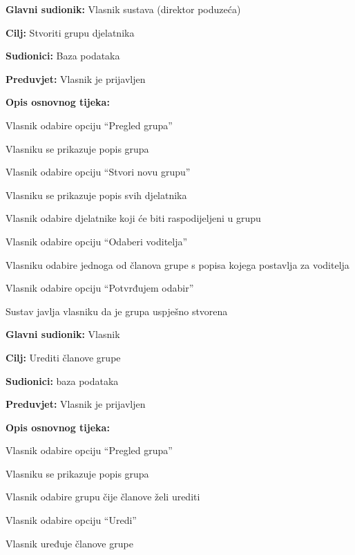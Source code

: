 			\noindent {}
			\begin{packed_item}
			
			\item \textbf{Glavni sudionik: } Vlasnik sustava (direktor poduzeća)
			\item  \textbf{Cilj:} Stvoriti grupu djelatnika 
			\item  \textbf{Sudionici:} Baza podataka
			\item  \textbf{Preduvjet:} Vlasnik je prijavljen
			\item  \textbf{Opis osnovnog tijeka:}
			\item[] \begin{packed_enum}
				\item Vlasnik odabire opciju “Pregled grupa” 
				\item Vlasniku se prikazuje popis grupa 
				\item Vlasnik odabire opciju “Stvori novu grupu” 
				\item Vlasniku se prikazuje popis svih djelatnika  
				\item Vlasnik odabire djelatnike koji će biti raspodijeljeni u grupu 
				\item Vlasnik odabire opciju “Odaberi voditelja” 
				\item Vlasniku odabire jednoga od članova grupe s popisa kojega postavlja za voditelja 
				\item Vlasnik odabire opciju “Potvrđujem odabir” 
				\item Sustav javlja vlasniku da je grupa uspješno stvorena 
					\end{packed_enum}
			\end{packed_item}
			\noindent \underbar{\textbf{UC7 -Uređivanje grupe}}
			\begin{packed_item}
				
				\item \textbf{Glavni sudionik: } Vlasnik
				\item  \textbf{Cilj:} Urediti članove grupe
				\item  \textbf{Sudionici:} baza podataka
				\item  \textbf{Preduvjet:} Vlasnik je prijavljen
				\item  \textbf{Opis osnovnog tijeka:}
				\item[] \begin{packed_enum}
					\item Vlasnik odabire opciju “Pregled grupa”
					\item Vlasniku se prikazuje popis grupa
					\item Vlasnik odabire grupu čije članove želi urediti
					\item Vlasnik odabire opciju “Uredi”
					\item Vlasnik uređuje članove grupe
				\end{packed_enum}
			\end{packed_item}
